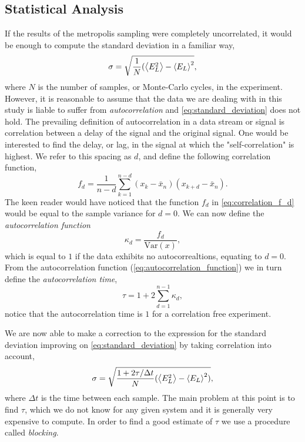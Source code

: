 \documentclass[
    a4paper, aps, twocolumn, floatfix, superscriptaddress, nofootinbib]{revtex4-1}
\newcommand{\1}{\mathds{1}}
\begin{document}
    \subsection{Statistical Analysis}
        If the results of the metropolis sampling were completely uncorrelated,
        it would be enough to compute the standard deviation in a familiar way,
        \begin{equation}
            \sigma = \sqrt{\frac{1}{N}(\ev{E^2_L} - \ev{E_L}^2},
            \label{eq:standard_deviation}
        \end{equation}
        where $N$ is the number of samples, or Monte-Carlo cycles, in the experiment.
        However, it is reasonable to assume that the data we are dealing with in this
        study is liable to suffer from \emph{autocorrelation} and \autoref{eq:standard_deviation}
        does not hold. The prevailing
        definition of autocorrelation in a data stream or signal is correlation
        between a delay of the signal and the original signal. One would be interested to find the
        delay, or lag, in the signal at which the "self-correlation" is highest. We refer to this
        spacing as $d$, and define the following correlation function,
        \begin{equation}
            f_d = \frac{1}{n -d} \sum_{k=1}^{n-d} (x_k - \bar{x}_n)(x_{k+d} - \bar{x}_n).
            \label{eq:correlation_f_d}
        \end{equation}
        The keen reader would have noticed that the function $f_d$ in \autoref{eq:correlation_f_d}
        would be equal to the sample variance for $d=0$. We can now define the \emph{autocorrelation function}
        \begin{equation}
            \kappa_d = \frac{f_d}{\text{Var}(x)},
            \label{eq:autocorrelation_function}
        \end{equation}
        which is equal to $1$ if the data exhibits no autocorrealtions, equating to $d=0$. From the autocorrelation
        function (\ref{eq:autocorrelation_function}) we in turn define the \emph{autocorrelation time},
        \begin{equation}
            \tau = 1 + 2 \sum_{d=1}^{n-1}\kappa_d,
        \end{equation}
        notice that the autocorrelation time is $1$ for a correlation free experiment.

        We are now able to make a correction to the expression for the standard deviation
        improving on \autoref{eq:standard_deviation} by taking correlation into account,
        \begin{equation}
            \sigma =\sqrt{\frac{1 + 2\tau / \Delta t}{N}(\ev{E^2_L} - \ev{E_L}^2)},
        \end{equation}
        where $\Delta t$ is the time between each sample. The main problem at this point is to
        find $\tau$, which we do not know for any given system and it is generally very expensive to
        compute. In order to find a good estimate of $\tau$ we use a procedure called \emph{blocking}.
\end{document}
